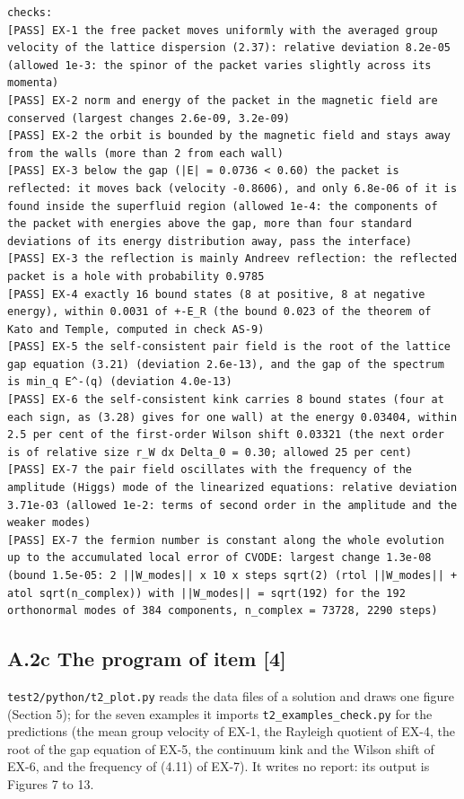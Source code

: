 \documentclass[
  10pt,
]{article}
\begin{document}
\begin{verbatim}
checks:
[PASS] EX-1 the free packet moves uniformly with the averaged group velocity of the lattice dispersion (2.37): relative deviation 8.2e-05 (allowed 1e-3: the spinor of the packet varies slightly across its momenta)
[PASS] EX-2 norm and energy of the packet in the magnetic field are conserved (largest changes 2.6e-09, 3.2e-09)
[PASS] EX-2 the orbit is bounded by the magnetic field and stays away from the walls (more than 2 from each wall)
[PASS] EX-3 below the gap (|E| = 0.0736 < 0.60) the packet is reflected: it moves back (velocity -0.8606), and only 6.8e-06 of it is found inside the superfluid region (allowed 1e-4: the components of the packet with energies above the gap, more than four standard deviations of its energy distribution away, pass the interface)
[PASS] EX-3 the reflection is mainly Andreev reflection: the reflected packet is a hole with probability 0.9785
[PASS] EX-4 exactly 16 bound states (8 at positive, 8 at negative energy), within 0.0031 of +-E_R (the bound 0.023 of the theorem of Kato and Temple, computed in check AS-9)
[PASS] EX-5 the self-consistent pair field is the root of the lattice gap equation (3.21) (deviation 2.6e-13), and the gap of the spectrum is min_q E^-(q) (deviation 4.0e-13)
[PASS] EX-6 the self-consistent kink carries 8 bound states (four at each sign, as (3.28) gives for one wall) at the energy 0.03404, within 2.5 per cent of the first-order Wilson shift 0.03321 (the next order is of relative size r_W dx Delta_0 = 0.30; allowed 25 per cent)
[PASS] EX-7 the pair field oscillates with the frequency of the amplitude (Higgs) mode of the linearized equations: relative deviation 3.71e-03 (allowed 1e-2: terms of second order in the amplitude and the weaker modes)
[PASS] EX-7 the fermion number is constant along the whole evolution up to the accumulated local error of CVODE: largest change 1.3e-08 (bound 1.5e-05: 2 ||W_modes|| x 10 x steps sqrt(2) (rtol ||W_modes|| + atol sqrt(n_complex)) with ||W_modes|| = sqrt(192) for the 192 orthonormal modes of 384 components, n_complex = 73728, 2290 steps)
\end{verbatim}

\hypertarget{a.2c-the-program-of-item-4}{%
\subsection{A.2c The program of item
{[}4{]}}\label{a.2c-the-program-of-item-4}}

\texttt{test2/python/t2\_plot.py} reads the data files of a solution and
draws one figure (Section 5); for the seven examples it imports
\texttt{t2\_examples\_check.py} for the predictions (the mean group
velocity of EX-1, the Rayleigh quotient of EX-4, the root of the gap
equation of EX-5, the continuum kink and the Wilson shift of EX-6, and
the frequency of (4.11) of EX-7). It writes no report: its output is
Figures 7 to 13.
\end{document}
